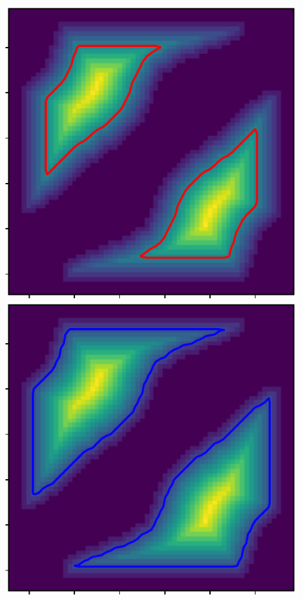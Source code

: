 \begin{figure}[htbp]
\centering
    \includegraphics[scale=0.85]{figures/hsn_as1_1.pdf}\hspace{0.5in}
    \includegraphics[scale=0.85]{figures/hsn_as1_2.pdf}
    \caption{}
    \label{fig:hsn_as1}
\end{figure}

